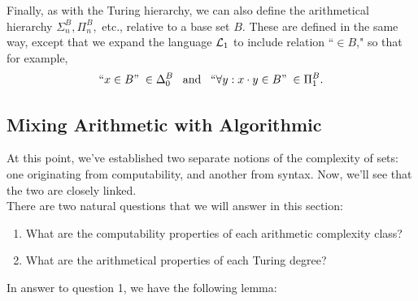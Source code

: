\documentclass{amsart}
\begin{document}
	Finally, as with the Turing hierarchy, we can also define the arithmetical hierarchy $\Sigma_n^B,\Pi_n^B,$ etc., relative to a base set $B$. These are defined in the same way, except that we expand the language $\mathcal{L}_1$ to include relation ``$\in B$," so that for example, 
	$$``x\in B" \; \in \Delta_0^B \;\;\; \text{and} \;\;\; ``\forall y: x\cdot y \in B" \; \in \Pi_1^B.$$
	
	\subsection{Mixing Arithmetic with Algorithmic}
	
	At this point, we've established two separate notions of the complexity of sets: one originating from computability, and another from syntax. Now, we'll see that the two are closely linked.\\
	
	There are two natural questions that we will answer in this section: 
	\begin{enumerate}[label=\arabic*]
		\item What are the computability properties of each arithmetic complexity class?
		\item What are the arithmetical properties of each Turing degree?
	\end{enumerate}
	In answer to question 1, we have the following lemma:\\
	
\end{document}
